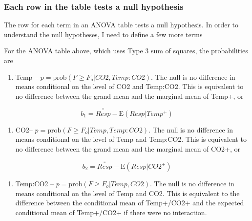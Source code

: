 \documentclass[]{book}
\providecommand{\tightlist}{%
  \setlength{\itemsep}{0pt}\setlength{\parskip}{0pt}}
\begin{document}
\hypertarget{each-row-in-the-table-tests-a-null-hypothesis}{%
\subsubsection{Each row in the table tests a null hypothesis}\label{each-row-in-the-table-tests-a-null-hypothesis}}

The row for each term in an ANOVA table tests a null hypothesis. In order to understand the null hypotheses, I need to define a few more terms

For the ANOVA table above, which uses Type 3 sum of squares, the probabilities are

\begin{enumerate}
\def\labelenumi{\arabic{enumi}.}
\tightlist
\item
  Temp -- \(p = \mathrm{prob}(F \ge F_o|CO2, Temp:CO2)\). The null is no difference in means conditional on the level of CO2 and Temp:CO2. This is equivalent to no difference between the grand mean and the marginal mean of Temp+, or
\end{enumerate}

\begin{equation}
b_1 = \overline{\overline{Resp}} - \mathrm{E}(Resp|Temp^+)
\end{equation}

\begin{enumerate}
\def\labelenumi{\arabic{enumi}.}
\setcounter{enumi}{1}
\tightlist
\item
  CO2-- \(p = \mathrm{prob}(F \ge F_o|Temp, Temp:CO2)\). The null is no difference in means conditional on the level of Temp and Temp:CO2. This is equivalent to no difference between the grand mean and the marginal mean of CO2+, or
\end{enumerate}

\begin{equation}
b_2 = \overline{\overline{Resp}} - \mathrm{E}(Resp|CO2^+)
\end{equation}

\begin{enumerate}
\def\labelenumi{\arabic{enumi}.}
\setcounter{enumi}{2}
\tightlist
\item
  Temp:CO2 -- \(p = \mathrm{prob}(F \ge F_o|Temp, CO2)\). The null is no difference in means conditional on the level of Temp and CO2. This is equivalent to the difference between the conditional mean of Temp+/CO2+ and the expected conditional mean of Temp+/CO2+ if there were no interaction.
\end{enumerate}
\end{document}
